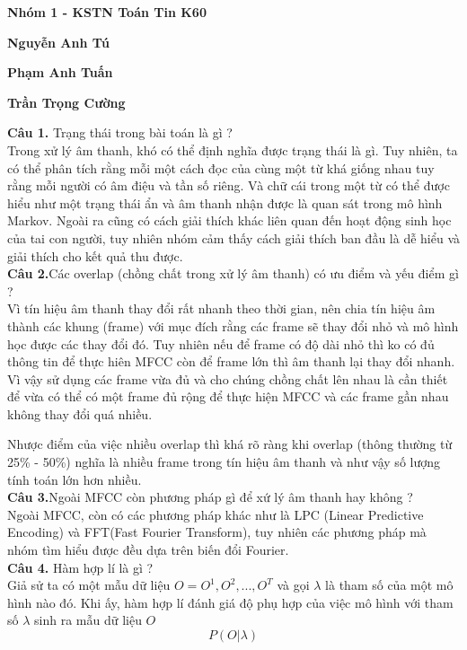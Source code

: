 \documentclass[13pt]{extreport}
\begin{document}
 
\textbf{Nhóm 1 - KSTN Toán Tin K60} \\ [0.5cm]
\par \textbf{Nguyễn Anh Tú}\\
\par \textbf{Phạm Anh Tuấn}\\
\par \textbf{Trần Trọng Cường}\\[1cm]
\par \textbf{Câu 1.} Trạng thái trong bài toán là gì ? \\
Trong xử lý âm thanh, khó có thể định nghĩa được trạng thái là gì. Tuy nhiên, ta có thể phân tích rằng mỗi một cách đọc của cùng một từ khá giống nhau tuy rằng mỗi người có âm điệu và tần số riêng. Và chữ cái trong một từ có thể được hiểu như một trạng thái ẩn và âm thanh nhận được là quan sát trong mô hình Markov. Ngoài ra cũng có cách giải thích khác liên quan đến hoạt động sinh học của tai con người, tuy nhiên nhóm cảm thấy cách giải thích ban đầu là dễ hiểu và giải thích cho kết quả thu được. \\

\textbf{Câu 2.}Các overlap (chồng chất trong xử lý âm thanh) có ưu điểm và yếu điểm gì ? \\
Vì tín hiệu âm thanh thay đổi rất nhanh theo thời gian, nên chia tín hiệu âm thành các khung (frame) với mục đích rằng các frame sẽ thay đổi nhỏ và mô hình học được các thay đổi đó. Tuy nhiên nếu để frame có độ dài nhỏ thì ko có đủ thông tin để thực hiên MFCC còn để frame lớn thì âm thanh lại thay đổi nhanh. Vì vậy sử dụng các frame vừa đủ và cho chúng chồng chất lên nhau là cần thiết để vừa có thể có một frame đủ rộng để thực hiện MFCC và các frame gần nhau không thay đổi quá nhiều.

Nhược điểm của việc nhiều overlap thì khá rõ ràng khi overlap (thông thường từ 25\% - 50\%) nghĩa là nhiều frame trong tín hiệu âm thanh và như vậy số lượng tính toán lớn hơn nhiều. \\

\textbf{Câu 3.}Ngoài MFCC còn phương pháp gì để xứ lý âm thanh hay không ? \\
Ngoài MFCC, còn có các phương pháp khác như là LPC (Linear Predictive Encoding) và FFT(Fast Fourier Transform), tuy nhiên các phương pháp mà nhóm tìm hiểu được đều dựa trên biến đổi Fourier. \\

\textbf{Câu 4.} Hàm hợp lí là gì ? \\
Giả sử ta có một mẫu dữ liệu $O = {O^1, O^2, ..., O^T}$ và gọi $\lambda$ là tham số của một mô hình nào đó. Khi ấy, hàm hợp lí đánh giá độ phụ hợp của việc mô hình với tham số $\lambda$ sinh ra mẫu dữ liệu $O$
$$P(O | \lambda)$$
\end{document}

